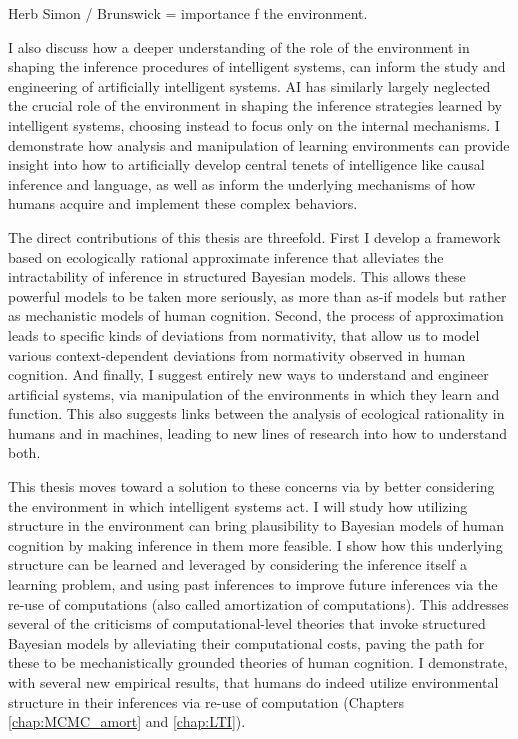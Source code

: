 Herb Simon / Brunswick = importance f the environment.

I also discuss how a deeper understanding of the role of the environment in shaping the inference procedures of intelligent systems, can inform the study and engineering of artificially intelligent systems. AI has similarly largely neglected the crucial role of the environment in shaping the inference strategies learned by intelligent systems, choosing instead to focus only on the internal mechanisms. I demonstrate how analysis and manipulation of learning environments can provide insight into how to artificially develop central tenets of intelligence like causal inference and language, as well as inform the underlying mechanisms of how humans acquire and implement these complex behaviors.

The direct contributions of this thesis are threefold. First I develop a framework based on ecologically rational approximate inference that alleviates the intractability of inference in structured Bayesian models. This allows these powerful models to be taken more seriously, as more than as-if models but rather as mechanistic models of human cognition. Second, the process of approximation leads to specific kinds of deviations from normativity, that allow us to model various context-dependent deviations from normativity observed in human cognition. And finally, I suggest entirely new ways to understand and engineer artificial systems, via manipulation of the environments in which they learn and function. This also suggests links between the analysis of ecological rationality in humans and in machines, leading to new lines of research into how to understand both.

This thesis moves toward a solution to these concerns via by better considering the environment in which intelligent systems act. I will study how utilizing structure in the environment can bring plausibility to Bayesian models of human cognition by making inference in them more feasible. I show how this underlying structure can be learned and leveraged by considering the inference itself a learning problem, and using past inferences to improve future inferences via the re-use of computations (also called amortization of computations). This addresses several of the criticisms of computational-level theories that invoke structured Bayesian models by alleviating their computational costs, paving the path for these to be mechanistically grounded theories of human cognition. I demonstrate, with several new empirical results, that humans do indeed utilize environmental structure in their inferences via re-use of computation (Chapters \ref{chap:MCMC_amort} and \ref{chap:LTI}). 

